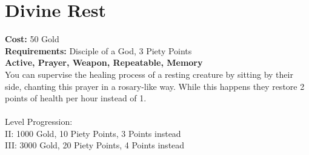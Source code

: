 \section{Divine Rest}
\textbf{Cost:} 50 Gold\\
\textbf{Requirements:} Disciple of a God, 3 Piety Points \\
\textbf{Active, Prayer, Weapon, Repeatable, Memory}\\
You can supervise the healing process of a resting creature by sitting by their side, chanting this prayer in a rosary-like way. While this happens they restore 2 points of health per hour instead of 1.\\
\\
Level Progression:\\
II: 1000 Gold, 10 Piety Points, 3 Points instead\\
III: 3000 Gold, 20 Piety Points, 4 Points instead\\